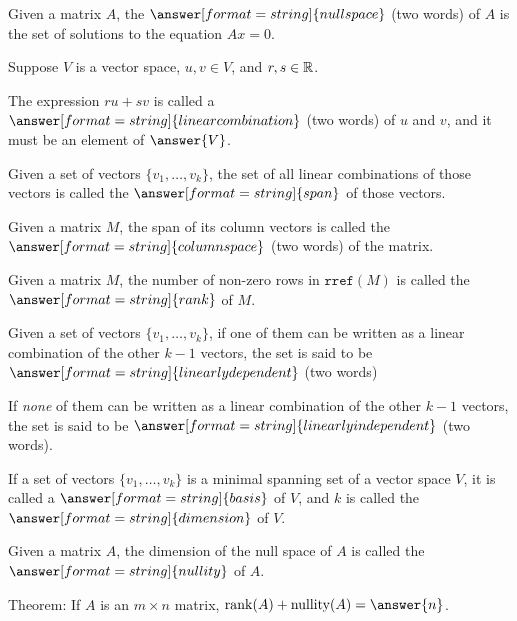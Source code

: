 \documentclass{ximera}
\begin{document}
\begin{question}
Given a matrix $A$, the $\answer[format=string]{null space}$ (two words) of $A$ is the set of 
solutions to the equation $Ax = 0$.  
\end{question}


\begin{question}
Suppose $V$ is a vector space, $u,v\in V$, and $r,s\in{\mathbb R}$.

The expression $ru+sv$ is called a $\answer[format=string]{linear combination}$ (two words) of $u$ and $v$, and it must be an element of $\answer{V}$.  
\end{question}

\begin{question}
Given a set of vectors $\{v_1, \dots, v_k\}$, the set of all linear combinations of those vectors is called the $\answer[format=string]{span}$ of those vectors.  
\end{question}

\begin{question}
Given a matrix $M$, the span of its column vectors is called the $\answer[format=string]{column space}$ (two words) of the matrix. 
\end{question}

\begin{question}
Given a matrix $M$, the number of non-zero rows in $\texttt{rref}(M)$ is called the $\answer[format=string]{rank}$ of $M$.  
\end{question}

\begin{question}
Given a set of vectors $\{v_1, \dots, v_k\}$, if one of them can be written as a linear combination of the other $k-1$ vectors, the set is said to be $\answer[format=string]{linearly dependent}$ (two words)

If \emph{none} of them can be written as a linear combination of the other $k-1$ vectors, the set is said to be $\answer[format=string]{linearly independent}$ (two words).  
\end{question}

\begin{question}
If a set of vectors $\{v_1, \dots, v_k\}$ is a minimal spanning set of a vector space $V$, it is called a $\answer[format=string]{basis}$ of $V$, and $k$ is called the $\answer[format=string]{dimension}$ of $V$.  
\end{question}

\begin{question}
Given a matrix $A$, the dimension of the null space of $A$ is called the $\answer[format=string]{nullity}$ of $A$.  
\end{question}

\begin{question}
Theorem:  If $A$ is an $m\times n$ matrix, $\rank(A) + \textrm{nullity}(A) = \answer{n}$.  
\end{question}
\end{document}
